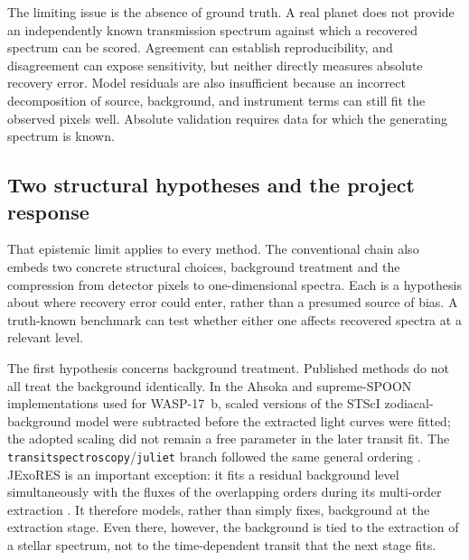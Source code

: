 The limiting issue is the absence of ground truth. A real planet does not
provide an independently known transmission spectrum against which a recovered
spectrum can be scored. Agreement can establish reproducibility, and
disagreement can expose sensitivity, but neither directly measures absolute
recovery error. Model residuals are also insufficient because an incorrect
decomposition of source, background, and instrument terms can still fit the
observed pixels well. Absolute validation requires data for which the generating
spectrum is known.

\FloatBarrier
\subsection{Two structural hypotheses and the project response}
\label{sec:structural-limitations-inference}
\label{sec:structural-limitations}
\label{sec:benchmark-and-nova}


That epistemic limit applies to every method. The conventional chain also
embeds two concrete structural choices, background treatment and the
compression from detector pixels to one-dimensional spectra. Each is a
hypothesis about where recovery error could enter, rather than a presumed
source of bias. A truth-known benchmark can test whether either one affects
recovered spectra at a relevant level.


The first hypothesis concerns background treatment. Published methods do not
all treat the background identically. In the Ahsoka and supreme-SPOON
implementations used for WASP-17~b, scaled versions of the STScI
zodiacal-background model were subtracted before the extracted light curves
were fitted; the adopted scaling did not remain a free parameter in the later
transit fit. The
\texttt{transitspectroscopy}/\texttt{juliet} branch followed the same general
ordering \citep{LouieEtAl2025}. JExoRES is an important exception: it fits a
residual background level simultaneously with the fluxes of the overlapping
orders during its multi-order extraction \citep{HolmbergMadhusudhan2023}. It
therefore models, rather than simply fixes, background at the extraction
stage. Even there, however, the background is tied to the extraction of a
stellar spectrum, not to the time-dependent transit that the next stage fits.


